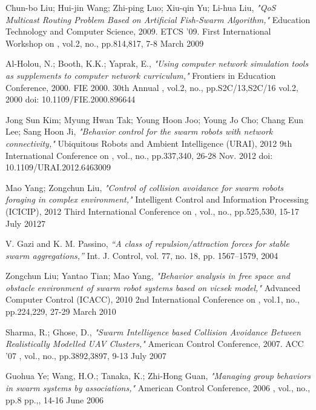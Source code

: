 \documentclass[journal]{IEEEtran}
\begin{document}
\begin{thebibliography}{1}
Chun-bo Liu; Hui-jin Wang; Zhi-ping Luo; Xiu-qin Yu; Li-hua Liu, \emph{"QoS Multicast Routing Problem Based on Artificial Fish-Swarm Algorithm,"} Education Technology and Computer Science, 2009. ETCS '09. First International Workshop on , vol.2, no., pp.814,817, 7-8 March 2009

Al-Holou, N.; Booth, K.K.; Yaprak, E., \emph{"Using computer network simulation tools as supplements to computer network curriculum,"} Frontiers in Education Conference, 2000. FIE 2000. 30th Annual , vol.2, no., pp.S2C/13,S2C/16 vol.2, 2000
doi: 10.1109/FIE.2000.896644

Jong Sun Kim; Myung Hwan Tak; Young Hoon Joo; Young Jo Cho; Chang Eun Lee; Sang Hoon Ji, \emph{"Behavior control for the swarm robots with network connectivity,"} Ubiquitous Robots and Ambient Intelligence (URAI), 2012 9th International Conference on , vol., no., pp.337,340, 26-28 Nov. 2012
doi: 10.1109/URAI.2012.6463009

Mao Yang; Zongchun Liu, \emph{"Control of collision avoidance for swarm robots foraging in complex environment,"} Intelligent Control and Information Processing (ICICIP), 2012 Third International Conference on , vol., no., pp.525,530, 15-17 July 20127

V. Gazi and K. M. Passino, \emph{“A class of repulsion/attraction forces for stable swarm aggregations,”} Int. J. Control, vol. 77, no. 18, pp.  1567–1579, 2004

Zongchun Liu; Yantao Tian; Mao Yang, \emph{"Behavior analysis in free space and obstacle environment of swarm robot systems based on vicsek model,"} Advanced Computer Control (ICACC), 2010 2nd International Conference on , vol.1, no., pp.224,229, 27-29 March 2010

Sharma, R.; Ghose, D., \emph{"Swarm Intelligence based Collision Avoidance Between Realistically Modelled UAV Clusters,"} American Control Conference, 2007. ACC '07 , vol., no., pp.3892,3897, 9-13 July 2007

Guohua Ye; Wang, H.O.; Tanaka, K.; Zhi-Hong Guan, \emph{"Managing group behaviors in swarm systems by associations,"} American Control Conference, 2006 , vol., no., pp.8 pp.,, 14-16 June 2006
\end{thebibliography}
\end{document}

